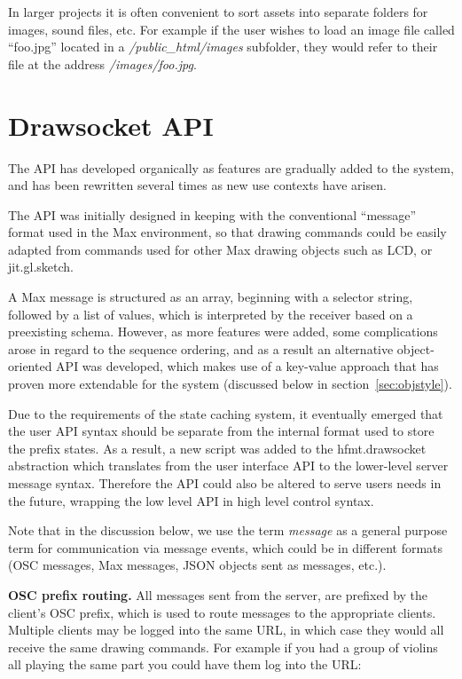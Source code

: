 In larger projects it is often convenient to sort assets into separate folders for images, sound files, etc. For example if the user wishes to load an image file called ``foo.jpg'' located in a \textit{/public\_html/images} subfolder, they would refer to their file at the address \textit{/images/foo.jpg}.

\section{Drawsocket API}\label{sec:api}
The \drawsocket API has developed organically as features are gradually added to the system, and has been rewritten several times as new use contexts have arisen.

The API was initially designed in keeping with the conventional ``message'' format used in the Max environment, so that drawing commands could be easily adapted from commands used for other Max drawing objects such as LCD, or jit.gl.sketch.

A Max message is structured as an array, beginning with a selector string, followed by a list of values, which is interpreted by the receiver based on a preexisting schema.
However, as more features were added, some complications arose in regard to the sequence ordering, and as a result an alternative object-oriented API was developed, which makes use of a key-value approach that has proven more extendable for the \drawsocket system (discussed below in section~\ref{sec:objstyle}).

Due to the requirements of the state caching system, it eventually emerged that the user API syntax should be separate from the internal format used to store the prefix states.
As a result, a new script was added to the hfmt.drawsocket abstraction which translates from the user interface API to the lower-level server message syntax.
Therefore the API could also be altered to serve users needs in the future, wrapping the low level API in high level control syntax.

Note that in the discussion below, we use the term \textit{message} as a general purpose term for communication via message events, which could be in different formats (OSC messages, Max messages, JSON objects sent as messages, etc.).


\medskip
\noindent
\textbf{OSC prefix routing.}  
All messages sent from the server, are prefixed by the client's OSC prefix, which is used to route messages to the appropriate clients. 
Multiple clients may be logged into the same URL, in which case they would all receive the same drawing commands. 
For example if you had a group of violins all playing the same part you could have them log into the URL:

